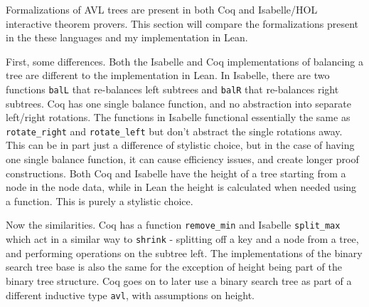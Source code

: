 Formalizations of AVL trees are present in both Coq\cite{code:coq} and Isabelle/HOL\cite{isabelle} interactive theorem provers. This section will compare the formalizations present in the these languages and my implementation in Lean.

First, some differences. Both the Isabelle and Coq implementations of balancing a tree are different to the implementation in Lean. In Isabelle, there are two functions \lstinline{balL} that re-balances left subtrees and \lstinline{balR} that re-balances right subtrees. Coq has one single balance function, and no abstraction into separate left/right rotations. The functions in Isabelle functional essentially the same as \lstinline{rotate_right} and \lstinline{rotate_left} but don't abstract the single rotations away. This can be in part just a difference of stylistic choice, but in the case of having one single balance function, it can cause efficiency issues, and create longer proof constructions. Both Coq and Isabelle have the height of a tree starting from a node in the node data, while in Lean the height is calculated when needed using a function. This is purely a stylistic choice. 

Now the similarities. Coq has a function \lstinline{remove_min} and Isabelle \lstinline{split_max} which act in a similar way to \lstinline{shrink} - splitting off a key and a node from a tree, and performing operations on the subtree left. The implementations of the binary search tree base is also the same for the exception of height being part of the binary tree structure. Coq goes on to later use a binary search tree as part of a different inductive type \lstinline{avl}, with assumptions on height.